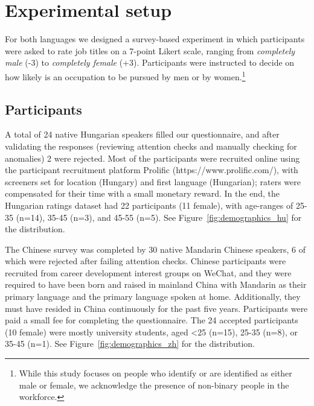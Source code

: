 \documentclass[11pt]{article}
\begin{document}
\section{Experimental setup}\label{sec:experiment_setup}

For both languages we designed a survey-based experiment in which participants were asked to rate job titles on a 7-point Likert scale, ranging from \textit{completely male} (-3) to \textit{completely female} (+3). Participants were instructed to decide on how likely is an occupation to be pursued by men or by women.\footnote{While this study focuses on people who identify or are identified as either male or female, we acknowledge the presence of non-binary people in the workforce.}

\subsection{Participants}


A total of 24 native Hungarian speakers filled our questionnaire, and after validating the responses (reviewing attention checks and manually checking for anomalies) 2 were rejected. Most of the participants were recruited online using the participant recruitment platform Prolific (https://www.prolific.com/), with screeners set for location (Hungary) and first language (Hungarian); raters were compensated for their time with a small monetary reward. In the end, the Hungarian ratings dataset had 22 participants (11 female), with age-ranges of 25-35 (n=14), 35-45 (n=3), and 45-55 (n=5). See Figure~\ref{fig:demographics_hu} for the distribution.


The Chinese survey was completed by 30 native Mandarin Chinese speakers, 6 of which were rejected after failing attention checks. Chinese participants were recruited from career development interest groups on WeChat, and they were required to have been born and raised in mainland China with Mandarin as their primary language and the primary language spoken at home. Additionally, they must have resided in China continuously for the past five years. Participants were paid a small fee for completing the questionnaire. The 24 accepted participants (10 female) were mostly university students, aged <25 (n=15), 25-35 (n=8), or 35-45 (n=1). See Figure~\ref{fig:demographics_zh} for the distribution.
\end{document}
